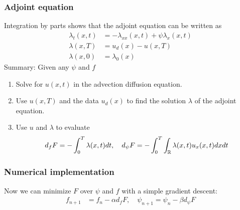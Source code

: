 \documentclass{beamer}
\begin{document}
\begin{frame}
\frametitle{Adjoint equation}
Integration by parts shows that the adjoint equation can be written as
\begin{equation}\label{adjoint_pde}
	\begin{split}
	\lambda_t(x,t) &= - \lambda_{xx}(x,t) + \psi \lambda_x(x,t) \\
	\lambda(x, T) &= u_{d}(x) - u(x, T) \\
	\lambda(x,0) &= \lambda_0(x)
	\end{split}
\end{equation}
\alert{Summary:} Given any $\psi$ and $f$
\begin{enumerate}
  \item Solve for $u(x, t)$ in the advection diffusion equation.
  \item Use $u(x, T)$ and the data $u_{d}(x)$ to find the solution $\lambda$ of the adjoint equation.
  \item Use $u$ and $\lambda$ to evaluate
  \begin{equation*}
	\begin{split}
	  d_f F & = -\int_{0}^{T} \lambda(x, t) dt, \quad d_\psi F = -\int_{0}^{T} \int_{\mathbb{R}} \lambda(x,t) u_{x}(x, t)dxdt\\
	\end{split}
\end{equation*}
\end{enumerate}

\end{frame}

\begin{frame}
\frametitle{Numerical implementation}

Now we can minimize $F$ over $\psi$ and $f$ with a simple gradient descent:
\begin{equation*}
	\begin{split}
	f_{n+1} &= f_n - \alpha d_{f} F, \quad \psi_{n+1}= \psi_{n} - \beta d_{\psi} F
	\end{split}
\end{equation*}
\end{frame}
\end{document}
